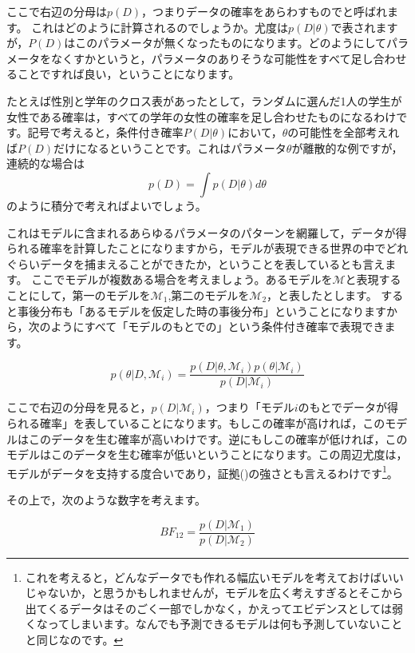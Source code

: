 \documentclass{ltjsbook}
\begin{document}
ここで右辺の分母は$p(D)$，つまりデータの確率をあらわすものでと呼ばれます。
これはどのように計算されるのでしょうか。尤度は$p(D| \theta)$で表されますが，$P(D)$はこのパラメータが無くなったものになります。どのようにしてパラメータをなくすかというと，パラメータのありそうな可能性をすべて足し合わせることですれば良い，ということになります。

たとえば性別と学年のクロス表があったとして，ランダムに選んだ1人の学生が女性である確率は，すべての学年の女性の確率を足し合わせたものになるわけです。記号で考えると，条件付き確率$P(D| \theta)$において，$\theta$の可能性を全部考えれば$P(D)$だけになるということです。これはパラメータ$\theta$が離散的な例ですが，連続的な場合は
$$ p(D) = \int p(D | \theta ) d\theta $$
のように積分で考えればよいでしょう。

これはモデルに含まれるあらゆるパラメータのパターンを網羅して，データが得られる確率を計算したことになりますから，モデルが表現できる世界の中でどれぐらいデータを捕まえることができたか，ということを表しているとも言えます。
ここでモデルが複数ある場合を考えましょう。あるモデルを$\mathcal{M}$と表現することにして，第一のモデルを$\mathcal{M}_1$,第二のモデルを$\mathcal{M}_2$，と表したとします。
すると事後分布も「あるモデルを仮定した時の事後分布」ということになりますから，次のようにすべて「モデルのもとでの」という条件付き確率で表現できます。

$$ p(\theta | D,\mathcal{M}_i) = \frac{p(D | \theta,\mathcal{M}_i)p(\theta | \mathcal{M}_i)}{p(D| \mathcal{M}_i)} $$

ここで右辺の分母を見ると，$p(D| \mathcal{M}_i)$，つまり「モデル$i$のもとでデータが得られる確率」を表していることになります。もしこの確率が高ければ，このモデルはこのデータを生む確率が高いわけです。逆にもしこの確率が低ければ，このモデルはこのデータを生む確率が低いということになります。この周辺尤度は，モデルがデータを支持する度合いであり，証拠()の強さとも言えるわけです\footnote{これを考えると，どんなデータでも作れる幅広いモデルを考えておけばいいじゃないか，と思うかもしれませんが，モデルを広く考えすぎるとそこから出てくるデータはそのごく一部でしかなく，かえってエビデンスとしては弱くなってしまいます。なんでも予測できるモデルは何も予測していないことと同じなのです。}。

その上で，次のような数字を考えます。

\[ BF_{12} = \frac{p(D| \mathcal{M}_1)}{p(D| \mathcal{M}_2)} \]
\end{document}
